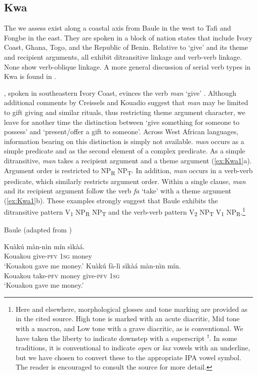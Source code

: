 \documentclass[output=paper,colorlinks,citecolor=brown]{langscibook}
\begin{document}
\subsection{Kwa}

The  we assess exist along a coastal axis from Baule in the west to Tafi and Fongbe in the east. They are spoken in a block of nation states that include Ivory Coast, Ghana, Togo, and the Republic of Benin. Relative to ‘give’ and its theme and recipient arguments, all exhibit ditransitive linkage and verb-verb linkage. None show verb-oblique linkage. A more general discussion of serial verb types in Kwa is found in \citet{Shluinsky2017}.

, spoken in southeastern Ivory Coast, evinces the verb \textit{man} ‘give’ \citep{CreisselsKouadio2010}. Although additional comments by Creissels and Kouadio suggest that \textit{man} may be limited to gift giving and similar rituals, thus restricting theme argument character, we leave for another time the distinction between ‘give something for someone to possess’ and ‘present/offer a gift to someone’. Across West African languages, information bearing on this distinction is simply not available.  \textit{man} occurs as a simple predicate and as the second element of a complex predicate. As a simple ditransitive, \textit{man} takes a recipient argument and a theme argument (\ref{ex:Kwa1}a). Argument order is restricted to NP\textsubscript{R} NP\textsubscript{T}. In addition, \textit{man} occurs in a verb-verb predicate, which similarly restricts argument order. Within a single clause, \textit{man} and its recipient argument follow the verb \textit{fa} ‘take’ with a theme argument (\ref{ex:Kwa1}b). These examples strongly suggest that Baule exhibits the ditransitive pattern V\textsubscript{1} NP\textsubscript{R} NP\textsubscript{T} and the verb-verb pattern V\textsubscript{2} NP\textsubscript{T} V\textsubscript{1} NP\textsubscript{R}.\footnote{Here and elsewhere, morphological glosses and tone marking are provided as in the cited source. High tone is marked with an acute diacritic, Mid tone with a macron, and Low tone with a grave diacritic, as is conventional. We have taken the liberty to indicate downstep with a superscript ꜝ. In some traditions, it is conventional to indicate \textit{open} or \textit{lax} vowels with an underline, but we have chosen to convert these to the appropriate IPA vowel symbol. The reader is encouraged to consult the source for more detail.}

\ea \label{ex:Kwa1} Baule (adapted from \citealt[11]{CreisselsKouadio2010})
\begin{xlist}
\ex 
 \gll Kuàkú				màn-nìn		mín		sìkàá.\\
	Kouakou	give-\textsc{pfv}		1\textsc{sg}		money\\
\glt  ‘Kouakou gave me money.’ 
\ex
\gll Kuàkú			fà-lì 				sìkàá			màn-nìn		mín.\\
	Kouakou	take-\textsc{pfv}		money		give-\textsc{pfv}		1\textsc{sg}	\\
\glt  ‘Kouakou gave me money.’ 
\end{xlist}
\z
\end{document}
